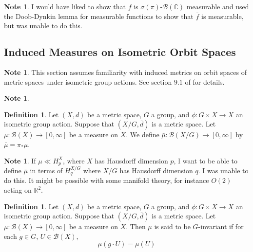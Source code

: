 \documentclass[12pt]{amsart}
\theoremstyle{definition}
\newtheorem{defn}[definition]{Definition}
\newtheorem{note}[definition]{Note}
\newcommand{\sig}{\sigma}
\newcommand{\C}{\mathbb{C}}
\newcommand{\R}{\mathbb{R}}
\newcommand{\MB}{\mathcal{B}}
\begin{document}
	\begin{note}
	I would have liked to show that $f$ is $\sig(\pi)$-$\MB(\C)$ measurable and used the Doob-Dynkin lemma for measurable functions to show that $\bar{f}$ is measurable, but was unable to do this.
	\end{note}
	
	
	
	
	
	
	
	
	
	
	
	
	
	
	
	
	
	
	
	\newpage
	\subsection{Induced Measures on Isometric Orbit Spaces}
	
	\begin{note}
	This section assumes familiarity with induced metrics on orbit spaces of metric spaces under isometric group actions. See section $9.1$ of \cite{analysis} for details. 
	\end{note}
	
	\begin{note}
	
	\end{note}
	
	\begin{defn}
	Let $(X, d)$ be a metric space, $G$ a group, and $\phi: G \times X \rightarrow X$ an isometric group action. Suppose that $(X/G, \bar{d})$ is a metric space. Let $\mu: \MB(X) \rightarrow [0, \infty]$ be a measure on $X$. We define $\bar{\mu}: \MB(X/G) \rightarrow [0, \infty]$ by $\bar{\mu} = \pi_* \mu$. 
	\end{defn}
	
	\begin{note}
	If $\mu \ll H_p^X$, where $X$ has Hausdorff dimension $p$, I want to be able to define $\bar{\mu}$ in terms of $H_q^{X/G}$ where $X/G$ has Hausdorff dimension $q$. I was unable to do this. It might be possible with some manifold theory, for instance $O(2)$ acting on $\R^2$.
	\end{note}
	
	\begin{defn}
	Let $(X, d)$ be a metric space, $G$ a group, and $\phi: G \times X \rightarrow X$ an isometric group action. Suppose that $(X/G, \bar{d})$ is a metric space. Let $\mu: \MB(X) \rightarrow [0, \infty]$ be a measure on $X$. Then $\mu$ is said to be $G$-invariant if for each $g \in G$, $U \in \MB(X)$, 
	\begin{equation*}
	\mu(g \cdot U) = \mu(U)
	\end{equation*}
	\end{defn}
	
\end{document}
